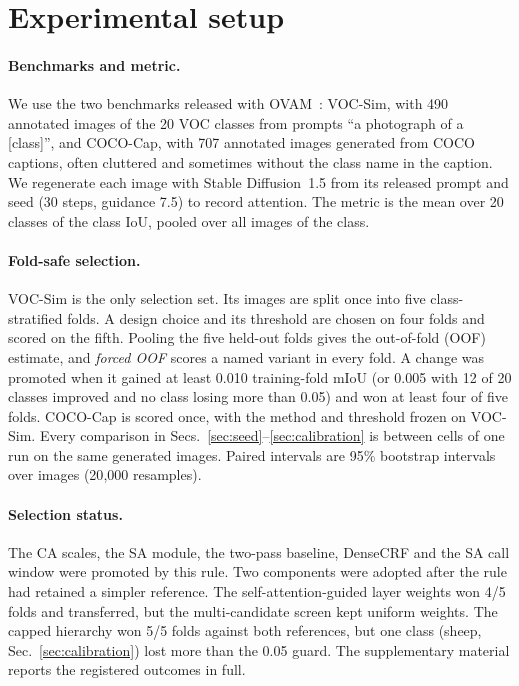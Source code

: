 \section{Experimental setup}
\label{sec:exp}
\paragraph{Benchmarks and metric.}
We use the two benchmarks released with OVAM~\cite{marcosmanchon2024ovam}: VOC-Sim, with 490 annotated images of the 20 VOC classes from prompts ``a photograph of a [class]'', and COCO-Cap, with 707 annotated images generated from COCO captions, often cluttered and sometimes without the class name in the caption. We regenerate each image with Stable Diffusion~1.5 from its released prompt and seed (30 steps, guidance 7.5) to record attention. The metric is the mean over 20 classes of the class IoU, pooled over all images of the class.

\paragraph{Fold-safe selection.}
VOC-Sim is the only selection set. Its images are split once into five class-stratified folds. A design choice and its threshold are chosen on four folds and scored on the fifth. Pooling the five held-out folds gives the out-of-fold (OOF) estimate, and \emph{forced OOF} scores a named variant in every fold. A change was promoted when it gained at least 0.010 training-fold mIoU (or 0.005 with 12 of 20 classes improved and no class losing more than 0.05) and won at least four of five folds. COCO-Cap is scored once, with the method and threshold frozen on VOC-Sim. Every comparison in Secs.~\ref{sec:seed}--\ref{sec:calibration} is between cells of one run on the same generated images. Paired intervals are 95\% bootstrap intervals over images (20{,}000 resamples).

\paragraph{Selection status.}
The CA scales, the SA module, the two-pass baseline, DenseCRF and the SA call window were promoted by this rule. Two components were adopted after the rule had retained a simpler reference. The self-attention-guided layer weights won 4/5 folds and transferred, but the multi-candidate screen kept uniform weights. The capped hierarchy won 5/5 folds against both references, but one class (sheep, Sec.~\ref{sec:calibration}) lost more than the 0.05 guard. The supplementary material reports the registered outcomes in full.
